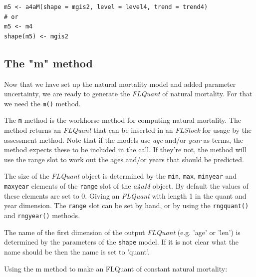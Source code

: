 \documentclass[a4paper,english,10pt]{article}\usepackage[]{graphicx}\usepackage[]{color}
\makeatletter
\newenvironment{kframe}{%
 \def\at@end@of@kframe{}%
 \ifinner\ifhmode%
  \def\at@end@of@kframe{\end{minipage}}%
  \begin{minipage}{\columnwidth}%
 \fi\fi%
 \def\FrameCommand##1{\hskip\@totalleftmargin \hskip-\fboxsep
 \colorbox{shadecolor}{##1}\hskip-\fboxsep
     \hskip-\linewidth \hskip-\@totalleftmargin \hskip\columnwidth}%
 \MakeFramed {\advance\hsize-\width
   \@totalleftmargin\z@ \linewidth\hsize
   \@setminipage}}%
 {\par\unskip\endMakeFramed%
 \at@end@of@kframe}
\newenvironment{knitrout}{}{} %
\newcommand{\code}[1]{{\texttt{#1}}}
\newcommand{\class}[1]{{\textit{#1}}}
\makeatother
\begin{document}
\begin{knitrout}
\color{fgcolor}\begin{kframe}
\begin{verbatim}
m5 <- a4aM(shape = mgis2, level = level4, trend = trend4)
# or
m5 <- m4
shape(m5) <- mgis2
\end{verbatim}
\end{kframe}
\end{knitrout}


\subsection{The "m" method}

Now that we have set up the natural mortality model and added parameter uncertainty, we are ready to generate the \class{FLQuant} of natural mortality. For that we need the \code{m()} method.

The \code{m} method is the workhorse method for computing natural mortality. The method returns an \class{FLQuant} that can be inserted in an \class{FLStock} for usage by the assessment method. Note that if the models use \emph{age} and/or \emph{year} as terms, the method expects these to be included in the call. If they're not, the method will use the range slot to work out the ages and/or years that should be predicted.


The size of the \class{FLQuant} object is determined by the \code{min}, \code{max}, \code{minyear} and \code{maxyear} elements of the \code{range} slot of the \class{a4aM} object. By default the values of these elements are set to 0. Giving an \class{FLQuant} with length 1 in the quant and year dimension. The \code{range} slot can be set by hand, or by using the \code{rngquant()} and \code{rngyear()} methods.

The name of the first dimension of the output \class{FLQuant} (e.g. 'age' or 'len') is determined by the parameters of the \code{shape} model. If it is not clear what the name should be then the name is set to 'quant'.

Using the m method to make an FLQuant of constant natural mortality:
\end{document}

